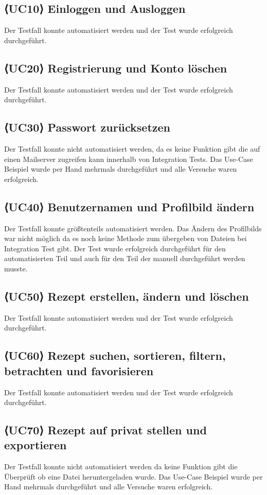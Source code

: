 \documentclass{qualitätssicherungsheft}
\begin{document}
\subsection{⟨UC10⟩ Einloggen und Ausloggen}
Der Testfall konnte automatisiert werden und der Test wurde erfolgreich durchgeführt. 
\subsection{⟨UC20⟩ Registrierung und Konto löschen}
Der Testfall konnte automatisiert werden und der Test wurde erfolgreich durchgeführt.
\subsection{⟨UC30⟩ Passwort zurücksetzen}
Der Testfall konnte nicht automatisiert werden, da es keine Funktion gibt die auf einen Mailserver zugreifen kann innerhalb von Integration Tests. Das Use-Case Beispiel wurde per Hand mehrmals durchgeführt und alle Versuche waren erfolgreich.
\subsection{⟨UC40⟩ Benutzernamen und Profilbild ändern}
Der Testfall konnte größtenteils automatisiert werden. Das Ändern des Profilbilds war nicht möglich da es noch keine Methode zum übergeben von Dateien bei Integration Test gibt. Der Test wurde erfolgreich durchgeführt für den automatisierten Teil und auch für den Teil der manuell durchgeführt werden musste.
\subsection{⟨UC50⟩ Rezept erstellen, ändern und löschen}
Der Testfall konnte automatisiert werden und der Test wurde erfolgreich durchgeführt.
\subsection{⟨UC60⟩ Rezept suchen, sortieren, filtern, betrachten und favorisieren}
Der Testfall konnte automatisiert werden und der Test wurde erfolgreich durchgeführt. 
\subsection{⟨UC70⟩ Rezept auf privat stellen und exportieren}
Der Testfall konnte nicht automatisiert werden da keine Funktion gibt die Überprüft ob eine Datei heruntergeladen wurde. Das Use-Case Beispiel wurde per Hand mehrmals durchgeführt und alle Versuche waren erfolgreich.
\end{document}
